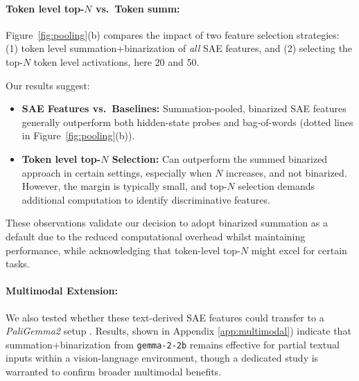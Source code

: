 \paragraph{Token level top-$N$ vs.\ Token summ:}
Figure~\ref{fig:pooling}(b) compares the impact of two feature selection strategies: (1) token level summation+binarization of \emph{all} SAE features, and (2) selecting the top-$N$ token level activations, here 20 and 50.

Our results suggest:
\begin{itemize}
    \item \textbf{SAE Features vs.\ Baselines:} Summation-pooled, binarized SAE features generally outperform both hidden-state probes and bag-of-words (dotted lines in Figure~\ref{fig:pooling}(b)). 
    \item \textbf{Token level top-$N$ Selection:} Can outperform the summed binarized approach in certain settings, especially when $N$ increases, and not binarized. However, the margin is typically small, and top-$N$ selection demands additional computation to identify discriminative features.
\end{itemize}
These observations validate our decision to adopt binarized summation as a default due to the reduced computational overhead whilst maintaining performance, while acknowledging that token-level top-$N$ might excel for certain tasks.

\paragraph{Multimodal Extension:}
We also tested whether these text-derived SAE features could transfer to a \emph{PaliGemma2} setup \cite{steiner2024paligemma2familyversatile}. Results, shown in Appendix \ref{app:multimodal}) indicate that summation+binarization from \texttt{gemma-2-2b} remains effective for partial textual inputs within a vision-language environment, though a dedicated study is warranted to confirm broader multimodal benefits.
